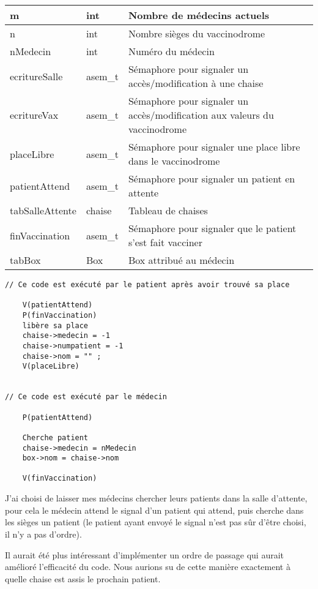 \documentclass[a4paper]{article}
\makeatletter
\newenvironment{expl}{%
  \begin{list}{}{%
      \small\itshape%
      \topsep\z@%
      \listparindent0pt%
      \parsep0.75\baselineskip%
      \setlength{\leftmargin}{20mm}%
      \setlength{\rightmargin}{20mm}%
    }
  \item[]}%
  {\end{list}}
\makeatother
\begin{document}
\begin{tabularx}{\linewidth}{|l|l|>{\strut}X|}
      \hline%
        m & int & Nombre de médecins actuels \\ \hline%
        n & int & Nombre sièges du vaccinodrome \\ \hline%
        nMedecin & int & Numéro du médecin \\ \hline%
        ecritureSalle & asem\_t & Sémaphore pour signaler un accès/modification à une chaise \\ \hline%
        ecritureVax & asem\_t & Sémaphore pour signaler un accès/modification aux valeurs du vaccinodrome \\ \hline%
        placeLibre & asem\_t & Sémaphore pour signaler une place libre dans le vaccinodrome \\ \hline%
           patientAttend & asem\_t & Sémaphore pour signaler un patient en attente \\ \hline%
         
        tabSalleAttente & chaise & Tableau de chaises\\ \hline%
        finVaccination & asem\_t & Sémaphore pour signaler que le patient s'est fait vacciner \\ \hline%
        tabBox & Box & Box attribué au médecin \\ \hline%
        
    \end{tabularx}


\begin{expl}

\begin{verbatim}
// Ce code est exécuté par le patient après avoir trouvé sa place
    
    V(patientAttend)
    P(finVaccination)
    libère sa place
    chaise->medecin = -1
    chaise->numpatient = -1
    chaise->nom = "" ;
    V(placeLibre)
    

// Ce code est exécuté par le médecin
    
    P(patientAttend)
    
    Cherche patient
    chaise->medecin = nMedecin 
    box->nom = chaise->nom 
    
    V(finVaccination)
\end{verbatim}
    
  J'ai choisi de laisser mes médecins chercher leurs patients dans la salle d'attente, pour cela le médecin attend le signal d'un patient qui attend, puis cherche dans les sièges un patient (le patient ayant envoyé le signal n'est pas sûr d'être choisi, il n'y a pas d'ordre).
  
  Il aurait été plus intéressant d'implémenter un ordre de passage qui aurait amélioré l'efficacité du code. Nous aurions 
  su de cette manière exactement à quelle chaise est assis le prochain patient.  
  
  
  
\end{expl}
\end{document}
